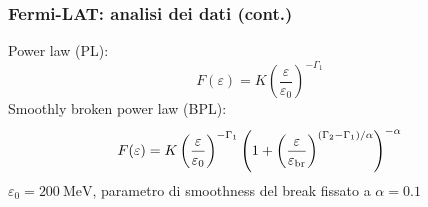 \documentclass[10pt]{beamer}
\renewcommand{\epsilon}{\varepsilon}
\begin{document}
\begin{frame}
  \frametitle{Fermi-LAT: analisi dei dati (cont.)}
  Power law (PL):
  \begin{equation*}
    F(\epsilon) = K
    \left(
      \frac{\epsilon}{\epsilon_{0}}
    \right)^{-\Gamma_{1}}
  \end{equation*}
  Smoothly broken power law (BPL):
  \begin{equation*}
    F(\epsilon) = K
    \left(
      \frac{\epsilon}{\epsilon_{0}}
    \right)^{-\Gamma_{1}}
    \left(
      1 +
      \left(
        \frac{\epsilon}{\epsilon_{\textup{br}}}
      \right)^{(\Gamma_{2} - \Gamma_{1})/\alpha}
    \right)^{-\alpha}
  \end{equation*}
  $\epsilon_{0} = \SI{200}{\mega \electronvolt}$, parametro di smoothness del
  break fissato a $\alpha = 0.1$
  \begin{table}
    \centering
  \end{table}
\end{frame}
\end{document}
